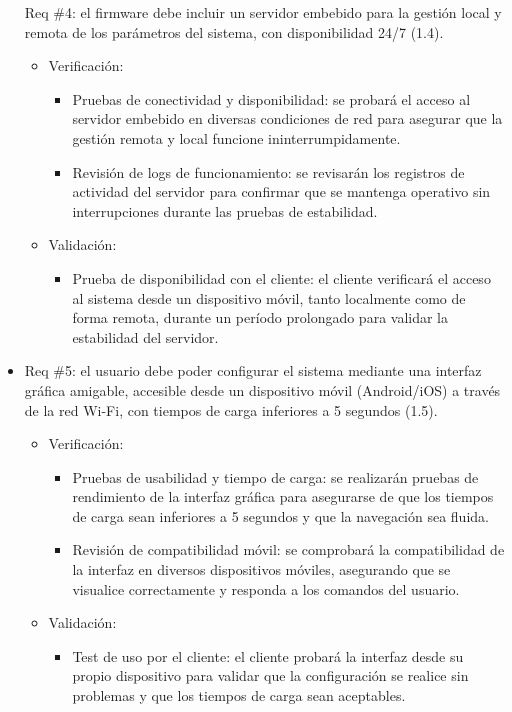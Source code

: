 \documentclass[
11pt, %
]{charter}
\begin{document}
\begin{itemize}
Req \#4: el firmware debe incluir un servidor embebido para la gestión local y remota de los parámetros del sistema, con disponibilidad 24/7 (1.4).
\begin{itemize}
    \item Verificación:
    \begin{itemize}
        \item Pruebas de conectividad y disponibilidad: se probará el acceso al servidor embebido en diversas condiciones de red para asegurar que la gestión remota y local funcione ininterrumpidamente.
        \item Revisión de logs de funcionamiento: se revisarán los registros de actividad del servidor para confirmar que se mantenga operativo sin interrupciones durante las pruebas de estabilidad.
    \end{itemize}
    \item Validación:
    \begin{itemize}
        \item Prueba de disponibilidad con el cliente: el cliente verificará el acceso al sistema desde un dispositivo móvil, tanto localmente como de forma remota, durante un período prolongado para validar la estabilidad del servidor.
    \end{itemize}
\end{itemize}

\item Req \#5: el usuario debe poder configurar el sistema mediante una interfaz gráfica amigable, accesible desde un dispositivo móvil (Android/iOS) a través de la red Wi-Fi, con tiempos de carga inferiores a 5 segundos (1.5).
\begin{itemize}
    \item Verificación:
    \begin{itemize}
        \item Pruebas de usabilidad y tiempo de carga: se realizarán pruebas de rendimiento de la interfaz gráfica para asegurarse de que los tiempos de carga sean inferiores a 5 segundos y que la navegación sea fluida.
        \item Revisión de compatibilidad móvil: se comprobará la compatibilidad de la interfaz en diversos dispositivos móviles, asegurando que se visualice correctamente y responda a los comandos del usuario.
    \end{itemize}
    \item Validación:
    \begin{itemize}
        \item Test de uso por el cliente: el cliente probará la interfaz desde su propio dispositivo para validar que la configuración se realice sin problemas y que los tiempos de carga sean aceptables.
    \end{itemize}
\end{itemize}


\end{itemize}
\end{document}
